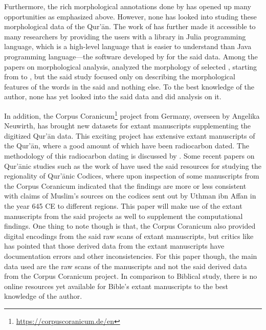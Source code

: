 Furthermore, the rich morphological annotations done by  has opened up many opportunities as emphasized above. However, none has looked into studing these morphological data of the Qur'\=an. The work of  has further made it accessible to many researchers by providing the users with a library in Julia programming language, which is a high-level language that is easier to understand than Java programming language---the software developed by  for the said data. Among the papers on morphological analysis,  analyzed the morphology of selected  , starting from   to  , but the said study focused only on describing the morphological features of the words in the said   and nothing else. To the best knowledge of the author, none has yet looked into the said data and did analysis on it.

In addition, the Corpus Coranicum\footnote{\url{https://corpuscoranicum.de/en}} project from Germany, overseen by Angelika Neuwirth, has brought new datasets for extant manuscripts supplementing the digitized Qur'\=an data. This exciting project has extensive extant manuscripts of the Qur'\=an, where a good amount of which have been radiocarbon dated. The methodology of this radiocarbon dating is discussed by . Some recent papers on Qur'\=anic studies such as the work of \cite{sidky2020} have used the said resources for studying the regionality of Qur'\=anic Codices, where upon inspection of some manuscripts from the Corpus Coranicum indicated that the findings are more or less consistent with claims of Muslim's sources on the codices sent out by Uthman ibn Affan  in the year 645 CE to different regions. This paper will make use of the extant manuscripts from the said projects as well to supplement the computational findings. One thing to note though is that, the Corpus Coranicum also provided digital encodings from the said raw scans of extant manuscripts, but critics like  has pointed that those derived data from the extant manuscripts have documentation errors and other inconsistencies. For this paper though, the main data used are the raw scans of the manuscripts and not the said derived data from the Corpus Coranicum project. In comparison to Biblical study, there is no online resources yet available for Bible's extant manuscripts to the best knowledge of the author.  

